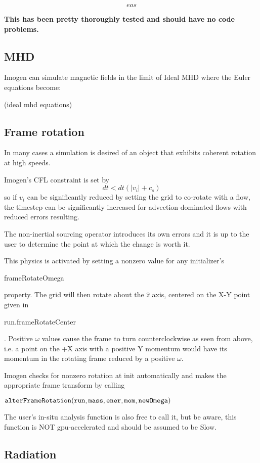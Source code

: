 \documentclass[letterpaper,12pt,twocolumn]{article}
\begin{document}
\[ eos \]

\textbf{This has been pretty thoroughly tested and should have no code problems.}

\subsection{MHD}

Imogen can simulate magnetic fields in the limit of Ideal MHD where the Euler equations
become:

(ideal mhd equations)

\subsection{Frame rotation}

In many cases a simulation is desired of an object that exhibits coherent rotation at
high speeds.

Imogen's CFL constraint is set by
\[ dt < dt (|v_i| + c_s) \]
so if $v_i$ can be significantly reduced by setting the grid to co-rotate with a flow,
the timestep can be significantly increased for advection-dominated flows with reduced
errors resulting.

The non-inertial sourcing operator introduces its own errors and it is up to the user to
determine the point at which the change is worth it.

This physics is activated by setting a nonzero value for any initializer's
\begin{tt}frameRotateOmega\end{tt} property. The grid
will then rotate about the $\hat{z}$ axis, centered on the X-Y point given in
\begin{tt}run.frameRotateCenter\end{tt}. Positive $\omega$ values cause the frame to turn
counterclockwise as seen from above, i.e. a point on the +X axis with a positive Y momentum
would have its momentum in the rotating frame reduced by a positive $\omega$.

Imogen checks for nonzero rotation at init automatically and makes the appropriate frame
transform by calling

$\tt{alterFrameRotation(run, mass, ener, mom,\newline newOmega)}$

The user's in-situ analysis function is also free to call it, but be aware, this function
is NOT gpu-accelerated and should be assumed to be Slow.

\subsection{Radiation}
\end{document}
